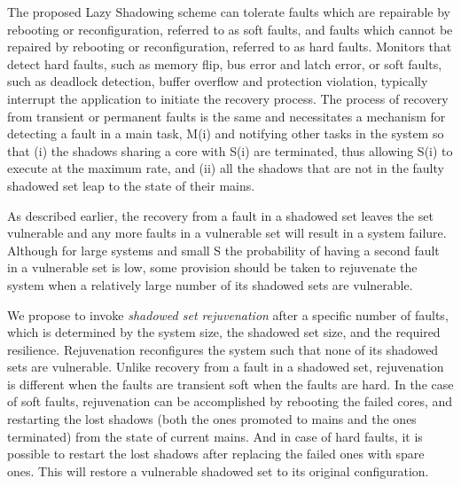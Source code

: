 The proposed Lazy Shadowing scheme can tolerate faults which are repairable by rebooting or reconfiguration, referred to as soft faults, and faults which cannot be repaired by rebooting or reconfiguration, referred to as hard 
faults. Monitors that detect hard faults, such as memory flip, bus error 
and latch error, or soft faults, such as deadlock detection, buffer overflow and protection violation, typically interrupt the application to initiate 
the recovery process. The process of recovery from transient or permanent faults is the same and necessitates a mechanism for detecting a fault 
in a main task, M(i) and notifying other tasks in the system so that (i) the shadows sharing a core with S(i) are terminated, thus allowing S(i) to execute at the maximum rate, and (ii) all the shadows that are not in the faulty shadowed set leap to the state of their mains. 

As described earlier, the recovery from a fault in a shadowed set leaves the set vulnerable and any more faults in a vulnerable set will result in a system failure. Although for large systems and small S the probability of having a second fault in a vulnerable set is low, some provision should be taken to rejuvenate the system when a relatively large number of its shadowed sets are vulnerable. 

We propose to invoke \emph{shadowed set rejuvenation} after a specific number of faults, which is determined by the system size, the shadowed set size, and the required resilience.
Rejuvenation reconfigures the system such that none of its shadowed sets are vulnerable. Unlike recovery from a fault in a shadowed set, rejuvenation is different when the faults are transient soft when the faults are hard. In the case of soft faults, rejuvenation can be accomplished by rebooting the failed cores, and restarting the lost shadows (both the ones promoted to mains and the ones terminated) from the state of current mains. And in case of hard faults, it is possible to restart the lost shadows after replacing the failed ones with spare ones. This will restore a vulnerable shadowed set to its original configuration. %


